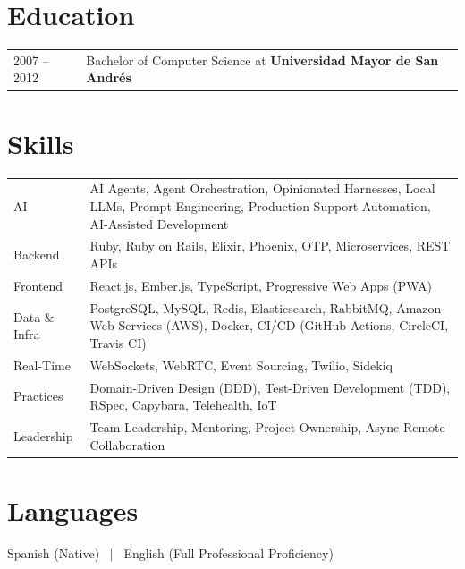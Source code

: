 \documentclass[a4paper,12pt]{article}
\begin{document}
\section{Education}
\begin{tabularx}{\linewidth}{@{}l X@{}}
2007 -- 2012 & Bachelor of Computer Science at \textbf{Universidad Mayor de San Andr\'es} \\
\end{tabularx}

\section{Skills}
\begin{tabularx}{\linewidth}{@{}l X@{}}
AI &  \normalsize{AI Agents, Agent Orchestration, Opinionated Harnesses, Local LLMs, Prompt Engineering, Production Support Automation, AI-Assisted Development}\\
Backend &  \normalsize{Ruby, Ruby on Rails, Elixir, Phoenix, OTP, Microservices, REST APIs}\\
Frontend &  \normalsize{React.js, Ember.js, TypeScript, Progressive Web Apps (PWA)}\\
Data \& Infra &  \normalsize{PostgreSQL, MySQL, Redis, Elasticsearch, RabbitMQ, Amazon Web Services (AWS), Docker, CI/CD (GitHub Actions, CircleCI, Travis CI)}\\
Real-Time &  \normalsize{WebSockets, WebRTC, Event Sourcing, Twilio, Sidekiq}\\
Practices &  \normalsize{Domain-Driven Design (DDD), Test-Driven Development (TDD), RSpec, Capybara, Telehealth, IoT}\\
Leadership &  \normalsize{Team Leadership, Mentoring, Project Ownership, Async Remote Collaboration}\\
\end{tabularx}

\section{Languages}
Spanish (Native) \ $|$ \ English (Full Professional Proficiency)

\vfill
{}
\end{document}
